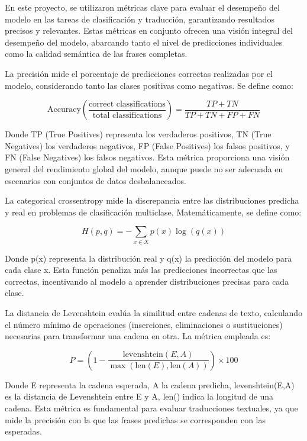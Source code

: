 \documentclass{article}
\newcounter{subsubsubsection}[subsubsection]
\begin{document}
En este proyecto, se utilizaron métricas clave para evaluar el desempeño del modelo en las tareas de clasificación y traducción, garantizando resultados precisos y relevantes. Estas métricas en conjunto ofrecen una visión integral del desempeño del modelo, abarcando tanto el nivel de predicciones individuales como la calidad semántica de las frases completas.


La precisión mide el porcentaje de predicciones correctas realizadas por el modelo, considerando tanto las clases positivas como negativas. Se define como:

\[
\text{Accuracy} \left( \frac{\text{correct classifications}}{\text{total classifications}} \right) = \frac{TP + TN}{TP + TN + FP + FN}
\]

Donde TP (True Positives) representa los verdaderos positivos, TN (True Negatives) los verdaderos negativos, FP (False Positives) los falsos positivos, y FN (False Negatives) los falsos negativos. Esta métrica proporciona una visión general del rendimiento global del modelo, aunque puede no ser adecuada en escenarios con conjuntos de datos desbalanceados.


La categorical crossentropy mide la discrepancia entre las distribuciones predicha y real en problemas de clasificación multiclase. Matemáticamente, se define como:

\[
H(p,q) = - \sum_{x \in X} p(x) \log(q(x))
\]

Donde p(x) representa la distribución real y q(x) la predicción del modelo para cada clase x. Esta función penaliza más las predicciones incorrectas que las correctas, incentivando al modelo a aprender distribuciones precisas para cada clase.      


La distancia de Levenshtein evalúa la similitud entre cadenas de texto, calculando el número mínimo de operaciones (inserciones, eliminaciones o sustituciones) necesarias para transformar una cadena en otra. La métrica empleada es:

\[
P = \left(1 - \frac{\text{levenshtein}(E, A)}{\max(\text{len}(E), \text{len}(A))}\right) \times 100
\]

Donde E representa la cadena esperada, A la cadena predicha, levenshtein(E,A) es la distancia de Levenshtein entre E y A, len() indica la longitud de una cadena. Esta métrica es fundamental para evaluar traducciones textuales, ya que mide la precisión con la que las frases predichas se corresponden con las esperadas.
\end{document}
